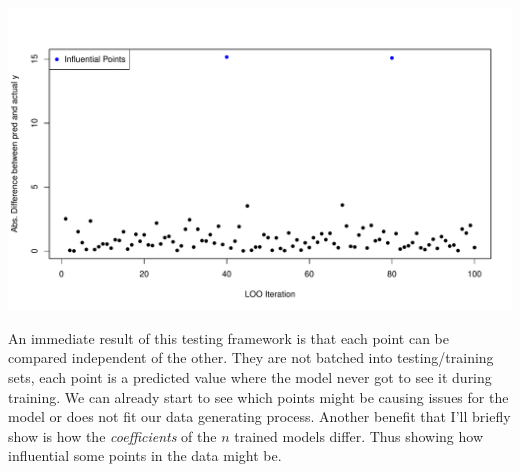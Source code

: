 \documentclass[
  letterpaper,
  DIV=11,
  numbers=noendperiod]{scrartcl}
\begin{document}
\begin{center}
\includegraphics{ch1_files/figure-pdf/unnamed-chunk-1-1.pdf}
\end{center}

An immediate result of this testing framework is that each point can be
compared independent of the other. They are not batched into
testing/training sets, each point is a predicted value where the model
never got to see it during training. We can already start to see which
points might be causing issues for the model or does not fit our data
generating process. Another benefit that I'll briefly show is how the
\emph{coefficients} of the \(n\) trained models differ. Thus showing how
influential some points in the data might be.
\end{document}
